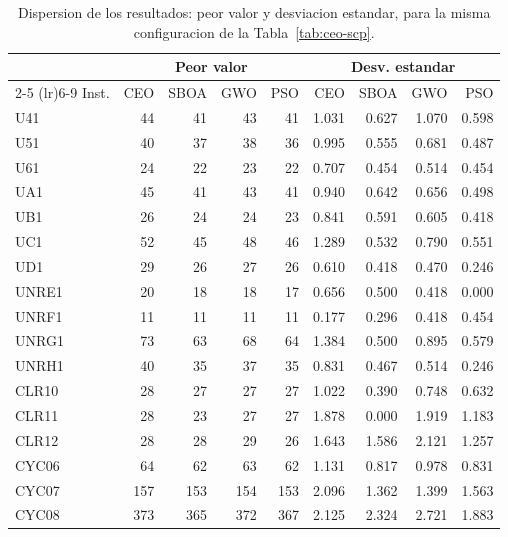 \begin{table}[htbp]
\centering
\footnotesize
\caption{Dispersion de los resultados: peor valor y desviacion estandar, para la misma configuracion de la Tabla~\ref{tab:ceo-scp}.}
\label{tab:ceo-scp-disp}
\begin{tabular}{lrrrrrrrr}
\toprule
 & \multicolumn{4}{c}{Peor valor} & \multicolumn{4}{c}{Desv. estandar} \\
\cmidrule(lr){2-5} \cmidrule(lr){6-9}
Inst. & CEO & SBOA & GWO & PSO & CEO & SBOA & GWO & PSO \\
\midrule
U41 & 44 & 41 & 43 & 41 & 1.031 & 0.627 & 1.070 & 0.598 \\
U51 & 40 & 37 & 38 & 36 & 0.995 & 0.555 & 0.681 & 0.487 \\
U61 & 24 & 22 & 23 & 22 & 0.707 & 0.454 & 0.514 & 0.454 \\
UA1 & 45 & 41 & 43 & 41 & 0.940 & 0.642 & 0.656 & 0.498 \\
UB1 & 26 & 24 & 24 & 23 & 0.841 & 0.591 & 0.605 & 0.418 \\
UC1 & 52 & 45 & 48 & 46 & 1.289 & 0.532 & 0.790 & 0.551 \\
UD1 & 29 & 26 & 27 & 26 & 0.610 & 0.418 & 0.470 & 0.246 \\
UNRE1 & 20 & 18 & 18 & 17 & 0.656 & 0.500 & 0.418 & 0.000 \\
UNRF1 & 11 & 11 & 11 & 11 & 0.177 & 0.296 & 0.418 & 0.454 \\
UNRG1 & 73 & 63 & 68 & 64 & 1.384 & 0.500 & 0.895 & 0.579 \\
UNRH1 & 40 & 35 & 37 & 35 & 0.831 & 0.467 & 0.514 & 0.246 \\
CLR10 & 28 & 27 & 27 & 27 & 1.022 & 0.390 & 0.748 & 0.632 \\
CLR11 & 28 & 23 & 27 & 27 & 1.878 & 0.000 & 1.919 & 1.183 \\
CLR12 & 28 & 28 & 29 & 26 & 1.643 & 1.586 & 2.121 & 1.257 \\
CYC06 & 64 & 62 & 63 & 62 & 1.131 & 0.817 & 0.978 & 0.831 \\
CYC07 & 157 & 153 & 154 & 153 & 2.096 & 1.362 & 1.399 & 1.563 \\
CYC08 & 373 & 365 & 372 & 367 & 2.125 & 2.324 & 2.721 & 1.883 \\
\bottomrule
\end{tabular}
\end{table}

